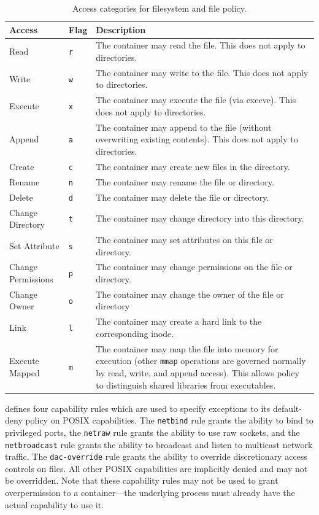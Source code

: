 {
\small
\begin{longtable}[c]{llp{25em}}
  \caption{
    Access categories for filesystem and file policy.
  }
  \label{tab:fs_policy}\\
  \toprule
  Access             & Flag       & Description \\
  \midrule
  \endfirsthead
  Read               & \texttt{r} & The container may read the file. This does not apply to directories. \\
  Write              & \texttt{w} & The container may write to the file. This does not apply to directories. \\
  Execute            & \texttt{x} & The container may execute the file (via execve). This does not apply to directories. \\
  Append             & \texttt{a} & The container may append to the file (without overwriting existing contents). This does not apply to directories.\\
  Create             & \texttt{c} & The container may create new files in the directory. \\
  Rename             & \texttt{n} & The container may rename the file or directory. \\
  Delete             & \texttt{d} & The container may delete the file or directory. \\
  Change Directory   & \texttt{t} & The container may change directory into this directory. \\
  Set Attribute      & \texttt{s} & The container may set attributes on this file or directory. \\
  Change Permissions & \texttt{p} & The container may change permissions on the file or directory. \\
  Change Owner       & \texttt{o} & The container may change the owner of the file or directory \\
  Link               & \texttt{l} & The container may create a hard link to the corresponding inode. \\
  Execute Mapped     & \texttt{m} & The container may map the file into memory for execution (other \texttt{mmap} operations are governed normally by read, write, and append access). This allows policy to distinguish shared libraries from executables. \\
  \bottomrule
\end{longtable}
}

\bpfcontain{} defines four capability rules which are used to specify exceptions to its default-deny policy on POSIX capabilities. The \texttt{netbind} rule grants the ability to bind to privileged ports, the \texttt{netraw} rule grants the ability to use raw sockets, and the \texttt{netbroadcast} rule grants the ability to broadcast and listen to multicast network traffic. The \texttt{dac-override} rule grants the ability to override discretionary access controls on files. All other POSIX capabilities are implicitly denied and may not be overridden. Note that these capability rules may not be used to grant overpermission to a container---the underlying process must already have the actual capability to use it.

